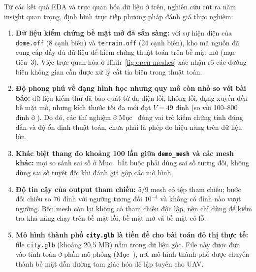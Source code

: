 Từ các kết quả EDA và trực quan hóa dữ liệu ở trên, nghiên cứu rút ra năm insight
quan trọng, định hình trực tiếp phương pháp đánh giá thực nghiệm:
\begin{enumerate}
  \item \textbf{Dữ liệu kiểm chứng bề mặt mở đã sẵn sàng:} với sự hiện diện của
    \texttt{dome.off} (8 cạnh biên) và \texttt{terrain.off} (24 cạnh biên), kho
    mã nguồn \cite{kien2026repo} đã cung cấp đầy đủ dữ liệu để kiểm chứng thuật
    toán trên bề mặt mở (mục tiêu~3). Việc trực quan hóa ở
    Hình~\ref{fig:open-meshes} xác nhận rõ các đường biên không gian cần được xử
    lý cắt tỉa biên trong thuật toán.
  \item \textbf{Độ phong phú về dạng hình học nhưng quy mô còn nhỏ so với bài
    báo:} dữ liệu kiểm thử đã bao quát từ đa diện lồi, không lồi, dạng xuyến đến
    bề mặt mở, nhưng kích thước tối đa mới đạt $V=49$ đỉnh (so với 100--800 đỉnh ở
    \cite{an2024funnel}). Do đó, các thí nghiệm ở Mục~ đóng vai
    trò kiểm chứng tính đúng đắn và độ ổn định thuật toán, chưa phải là phép đo
    hiệu năng trên dữ liệu lớn.
  \item \textbf{Khác biệt thang đo khoảng 100 lần giữa \texttt{demo\_mesh} và các
    mesh khác:} mọi so sánh sai số ở Mục~ bắt buộc phải dùng sai
    số tương đối, không dùng sai số tuyệt đối khi đánh giá gộp các mô hình.
  \item \textbf{Độ tin cậy của output tham chiếu:} 5/9 mesh có tệp tham chiếu;
    bước đối chiếu so 76 đỉnh với ngưỡng tương đối $10^{-4}$ và không có đỉnh nào
    vượt ngưỡng. Bốn mesh còn lại không có
    tham chiếu độc lập, nên chỉ dùng để kiểm tra khả năng chạy trên bề mặt lồi,
    bề mặt mở và bề mặt có lỗ.
  \item \textbf{Mô hình thành phố \texttt{city.glb} là tiền đề cho bài toán đô thị
    thực tế:} file \texttt{city.glb} (khoảng 20,5 MB) nằm trong
    dữ liệu gốc. File này được đưa vào tính toán ở phần mô phỏng
    (Mục~), nơi mô hình thành phố được chuyển thành bề mặt dẫn
    đường tam giác hóa để lập tuyến cho UAV.
\end{enumerate}
